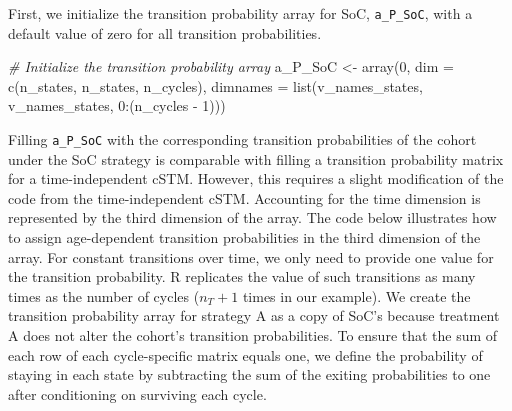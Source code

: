 \documentclass[
]{article}
\newenvironment{Shaded}{\begin{snugshade}}{\end{snugshade}}
\newcommand{\AttributeTok}[1]{\textcolor[rgb]{0.77,0.63,0.00}{#1}}
\newcommand{\CommentTok}[1]{\textcolor[rgb]{0.56,0.35,0.01}{\textit{#1}}}
\newcommand{\DecValTok}[1]{\textcolor[rgb]{0.00,0.00,0.81}{#1}}
\newcommand{\FunctionTok}[1]{\textcolor[rgb]{0.00,0.00,0.00}{#1}}
\newcommand{\NormalTok}[1]{#1}
\newcommand{\OtherTok}[1]{\textcolor[rgb]{0.56,0.35,0.01}{#1}}
\newcommand{\SpecialCharTok}[1]{\textcolor[rgb]{0.00,0.00,0.00}{#1}}
\begin{document}
First, we initialize the transition probability array for SoC, \texttt{a\_P\_SoC}, with a default value of zero for all transition probabilities.

\begin{Shaded}
\begin{Highlighting}[]
\CommentTok{\# Initialize the transition probability array}
\NormalTok{a\_P\_SoC }\OtherTok{\textless{}{-}} \FunctionTok{array}\NormalTok{(}\DecValTok{0}\NormalTok{, }\AttributeTok{dim =} \FunctionTok{c}\NormalTok{(n\_states, n\_states, n\_cycles),}
              \AttributeTok{dimnames =} \FunctionTok{list}\NormalTok{(v\_names\_states, v\_names\_states, }\DecValTok{0}\SpecialCharTok{:}\NormalTok{(n\_cycles }\SpecialCharTok{{-}} \DecValTok{1}\NormalTok{)))}
\end{Highlighting}
\end{Shaded}

Filling \texttt{a\_P\_SoC} with the corresponding transition probabilities of the cohort under the SoC strategy is comparable with filling a transition probability matrix for a time-independent cSTM. However, this requires a slight modification of the code from the time-independent cSTM. Accounting for the time dimension is represented by the third dimension of the array. The code below illustrates how to assign age-dependent transition probabilities in the third dimension of the array. For constant transitions over time, we only need to provide one value for the transition probability. R replicates the value of such transitions as many times as the number of cycles (\(n_T+1\) times in our example). We create the transition probability array for strategy A as a copy of SoC's because treatment A does not alter the cohort's transition probabilities. To ensure that the sum of each row of each cycle-specific matrix equals one, we define the probability of staying in each state by subtracting the sum of the exiting probabilities to one after conditioning on surviving each cycle.
\end{document}
